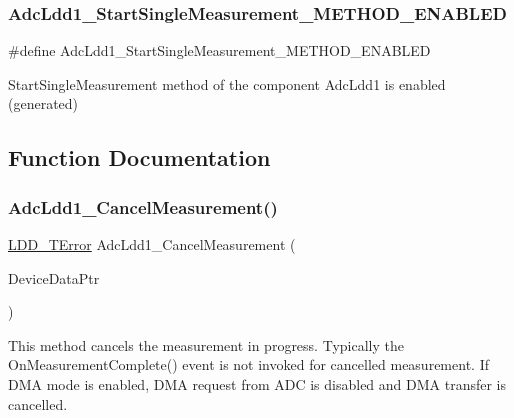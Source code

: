 \subsubsection{\texorpdfstring{Adc\+Ldd1\+\_\+\+Start\+Single\+Measurement\+\_\+\+M\+E\+T\+H\+O\+D\+\_\+\+E\+N\+A\+B\+L\+ED}{AdcLdd1\_StartSingleMeasurement\_METHOD\_ENABLED}}
{\footnotesize\ttfamily \#define Adc\+Ldd1\+\_\+\+Start\+Single\+Measurement\+\_\+\+M\+E\+T\+H\+O\+D\+\_\+\+E\+N\+A\+B\+L\+ED}

Start\+Single\+Measurement method of the component Adc\+Ldd1 is enabled (generated) 

\subsection{Function Documentation}
\mbox{\label{group___adc_ldd1__module_ga26924e7e4ca2c272140fbaf6ecf9c18d}} 
\subsubsection{\texorpdfstring{Adc\+Ldd1\+\_\+\+Cancel\+Measurement()}{AdcLdd1\_CancelMeasurement()}}
{\footnotesize\ttfamily \hyperlink{group___p_e___types__module_ga24c2b045fd04e79e85f261ce4df35588}{L\+D\+D\+\_\+\+T\+Error} Adc\+Ldd1\+\_\+\+Cancel\+Measurement (\begin{DoxyParamCaption}\item[{\hyperlink{group___p_e___types__module_gac5cf1362f1f0e3a2ce71b1bf2276d091}{L\+D\+D\+\_\+\+T\+Device\+Data} $\ast$}]{Device\+Data\+Ptr }\end{DoxyParamCaption})}



This method cancels the measurement in progress. Typically the On\+Measurement\+Complete() event is not invoked for cancelled measurement. If D\+MA mode is enabled, D\+MA request from A\+DC is disabled and D\+MA transfer is cancelled. 


